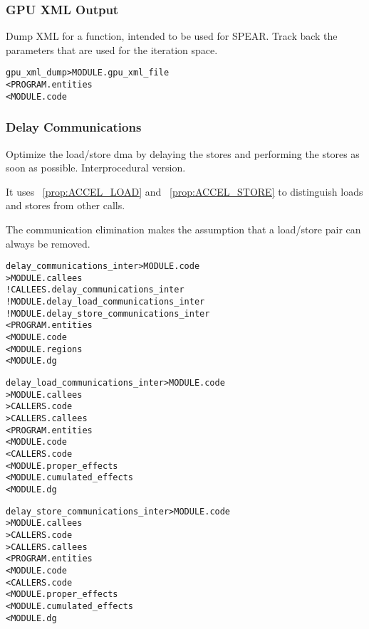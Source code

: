 \documentclass[a4paper]{report}
\newenvironment{PipsMake}{\begin{alltt}}{\end{alltt}}
\newcommand{\PipsPropRef}[1]{\texttt{\detokenize{#1}}~\ref{prop:#1}}
\newenvironment{PipsPass}[1]{\label{pass:#1}}{}
\begin{document}
\subsubsection{GPU XML Output}
\begin{PipsPass}{gpu_xml_dump}
Dump XML for a function, intended to be used for SPEAR. Track back the 
parameters that are used for the iteration space.
\end{PipsPass}


\begin{PipsMake}
gpu_xml_dump > MODULE.gpu_xml_file
         < PROGRAM.entities
         < MODULE.code
\end{PipsMake}


\subsubsection{Delay Communications}
\begin{PipsPass}{delay_communications_inter}
Optimize the load/store dma by delaying the stores and
performing the stores as soon as possible. Interprocedural version.
\end{PipsPass}

It uses \PipsPropRef{ACCEL_LOAD} and \PipsPropRef{ACCEL_STORE}
to distinguish loads and stores from other calls.

The communication elimination makes the assumption that a load/store pair can always be removed.

\begin{PipsMake}
delay_communications_inter                    > MODULE.code
        > MODULE.callees
        ! CALLEES.delay_communications_inter
        ! MODULE.delay_load_communications_inter
        ! MODULE.delay_store_communications_inter
        < PROGRAM.entities
        < MODULE.code
        < MODULE.regions
        < MODULE.dg
\end{PipsMake}
\begin{PipsMake}
delay_load_communications_inter                    > MODULE.code
        > MODULE.callees
        > CALLERS.code
        > CALLERS.callees
        < PROGRAM.entities
        < MODULE.code
        < CALLERS.code
        < MODULE.proper_effects
        < MODULE.cumulated_effects
        < MODULE.dg
\end{PipsMake}
\begin{PipsMake}
delay_store_communications_inter                    > MODULE.code
        > MODULE.callees
        > CALLERS.code
        > CALLERS.callees
        < PROGRAM.entities
        < MODULE.code
        < CALLERS.code
        < MODULE.proper_effects
        < MODULE.cumulated_effects
        < MODULE.dg
\end{PipsMake}
\end{document}

